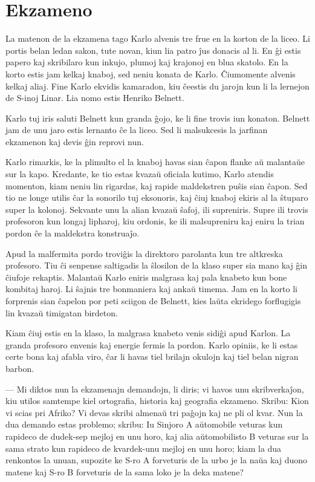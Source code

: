 \chapter{Ekzameno}

La matenon de la ekzamena tago Karlo alvenis tre frue en la korton de la liceo. Li portis belan ledan sakon, tute novan, kiun lia patro ĵus donacis al li. En ĝi estis papero kaj skribilaro kun inkujo, plumoj kaj krajonoj en blua skatolo. En la korto estis jam kelkaj knaboj, sed neniu konata de Karlo. Ĉiumomente alvenis kelkaj aliaj. Fine Karlo ekvidis kamaradon, kiu ĉeestis du jarojn kun li la lernejon de S-inoj Linar. Lia nomo estis Henriko Belnett.

Karlo tuj iris saluti Belnett kun granda ĝojo, ke li fine trovis iun konaton. Belnett jam de unu jaro estis lernanto ĉe la liceo. Sed li malsukcesis la jarfinan ekzamenon kaj devis ĝin reprovi nun.

Karlo rimarkis, ke la plimulto el la knaboj havas sian ĉapon flanke aŭ malantaŭe sur la kapo. Kredante, ke tio estas kvazaŭ oficiala kutimo, Karlo atendis momenton, kiam neniu lin rigardas, kaj rapide maldekstren puŝis sian ĉapon. Sed tio ne longe utilis ĉar la sonorilo tuj eksonoris, kaj ĉiuj knaboj ekiris al la ŝtuparo super la kolonoj. Sekvante unu la alian kvazaŭ ŝafoj, ili supreniris. Supre ili trovis profesoron kun longaj lipharoj, kiu ordonis, ke ili malsupreniru kaj eniru la trian pordon ĉe la maldekstra konstruaĵo.

Apud la malfermita pordo troviĝis la direktoro parolanta kun tre altkreska profesoro. Tiu ĉi senpense saltigadis la ŝlosilon de la klaso super sia mano kaj ĝin ĉiufoje rekaptis. Malantaŭ Karlo eniris malgrasa kaj pala knabeto kun bone kombitaj haroj. Li ŝajnis tre bonmaniera kaj ankaŭ timema. Jam en la korto li forprenis sian ĉapelon por peti sciigon de Belnett, kies laŭta ekridego forflugigis lin kvazaŭ timigatan birdeton.

Kiam ĉiuj estis en la klaso, la malgrasa knabeto venis sidiĝi apud Karlon. La granda profesoro envenis kaj energie fermis la pordon. Karlo opiniis, ke li estas certe bona kaj afabla viro, ĉar li havas tiel brilajn okulojn kaj tiel belan nigran barbon.

— Mi diktos nun la ekzamenajn demandojn, li diris; vi havos unu skribverkaĵon, kiu utilos samtempe kiel ortografia, historia kaj geografia ekzameno. Skribu: Kion vi scias pri Afriko? Vi devas skribi almenaŭ tri paĝojn kaj ne pli ol kvar. Nun la dua demando estas problemo; skribu: Iu Sinjoro A aŭtomobile veturas kun rapideco de dudek-sep mejloj en unu horo, kaj alia aŭtomobilisto B veturas sur la sama strato kun rapideco de kvardek-unu mejloj en unu horo; kiam la dua renkontos la unuan, supozite ke S-ro A forveturis de la urbo je la naŭa kaj duono matene kaj S-ro B forveturis de la sama loko je la deka matene?

